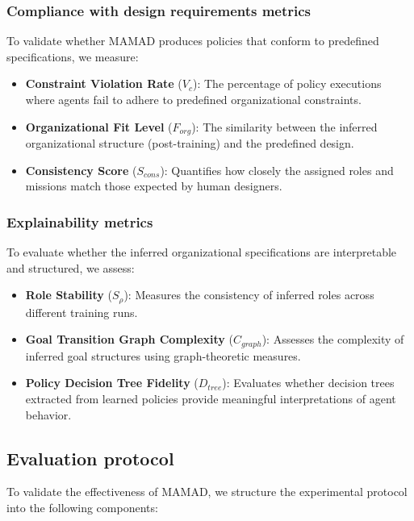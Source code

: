 \documentclass[pdflatex,sn-mathphys-num]{sn-jnl}%
\theoremstyle{thmstyleone}%
\theoremstyle{thmstyletwo}%
\theoremstyle{thmstylethree}%
\begin{document}
\subsubsection{Compliance with design requirements metrics}
To validate whether MAMAD produces policies that conform to predefined specifications, we measure:
\begin{itemize}
    \item \textbf{Constraint Violation Rate} ($V_c$): The percentage of policy executions where agents fail to adhere to predefined organizational constraints.
    \item \textbf{Organizational Fit Level} ($F_{org}$): The similarity between the inferred organizational structure (post-training) and the predefined design.
    \item \textbf{Consistency Score} ($S_{cons}$): Quantifies how closely the assigned roles and missions match those expected by human designers.
\end{itemize}

\subsubsection{Explainability metrics}
To evaluate whether the inferred organizational specifications are interpretable and structured, we assess:
\begin{itemize}
    \item \textbf{Role Stability} ($S_{\rho}$): Measures the consistency of inferred roles across different training runs.
    \item \textbf{Goal Transition Graph Complexity} ($C_{graph}$): Assesses the complexity of inferred goal structures using graph-theoretic measures.
    \item \textbf{Policy Decision Tree Fidelity} ($D_{tree}$): Evaluates whether decision trees extracted from learned policies provide meaningful interpretations of agent behavior.
\end{itemize}

\subsection{Evaluation protocol}

To validate the effectiveness of MAMAD, we structure the experimental protocol into the following components:
\end{document}
